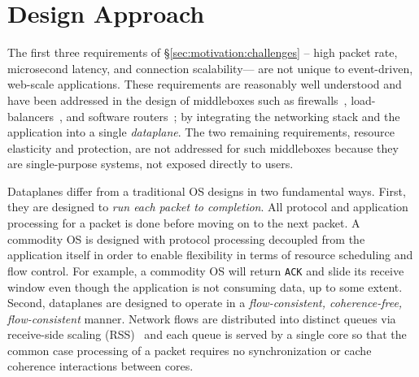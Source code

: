 \section{\ix Design Approach}
\label{sec:design}


The first three requirements of \S\ref{sec:motivation:challenges} --
high packet rate, microsecond latency, and connection scalability---
are not unique to event-driven, web-scale applications.  These
requirements are reasonably well understood and have been addressed in
the design of middleboxes such as firewalls~\cite{missing},
load-balancers~\cite{missing}, and software
routers~\cite{DBLP:journals/tocs/KohlerMCJK00,DBLP:conf/sosp/DobrescuEACFIKMR09};
by integrating the networking stack and the application into a single
\emph{dataplane}. The two remaining requirements, resource elasticity
and protection, are not addressed for such middleboxes because they
are single-purpose systems, not exposed directly to users. 


Dataplanes differ from a traditional OS designs in two fundamental
ways. First, they are designed to \emph{run each packet to
  completion}. All protocol and application processing for a packet is
done before moving on to the next packet.  A commodity OS is designed
with protocol processing decoupled from the application itself in
order to enable flexibility in terms of resource scheduling and flow
control. For example, a commodity OS will return \texttt{ACK} and
slide its receive window even though the application is not consuming
data, up to some extent. Second, dataplanes are designed to operate in
a \emph{flow-consistent, coherence-free, flow-consistent} manner.
Network flows are distributed into distinct queues via receive-side
scaling (RSS)~\cite{DBLP:journals/computer/RegnierMIIMHNCF04} and each queue
is served by a single core so that the common case processing of a
packet requires no synchronization or cache coherence interactions
between cores.

